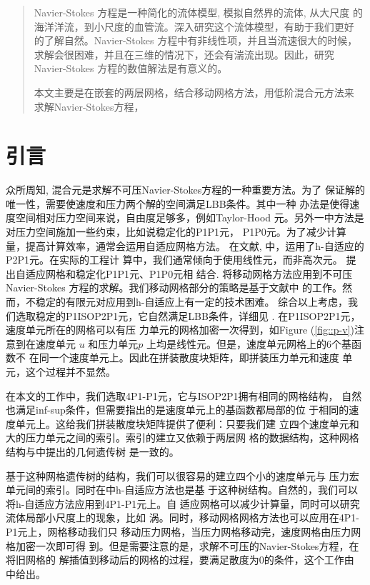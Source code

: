 \documentclass{report}
\theoremstyle{Remark}
\begin{document}
\begin{abstract}
   Navier-Stokes 方程是一种简化的流体模型, 模拟自然界的流体, 从大尺度
   的海洋洋流，到小尺度的血管流。深入研究这个流体模型，有助于我们更好
   的了解自然。Navier-Stokes 方程中有非线性项，并且当流速很大的时候，
   求解会很困难，并且在三维的情况下，还会有湍流出现。因此，研究
   Navier-Stokes 方程的数值解法是有意义的。
 
   本文主要是在嵌套的两层网格，结合移动网格方法，用低阶混合元方法来
   求解Navier-Stokes方程，

\end{abstract}   

\chapter{引言}
     众所周知, 混合元是求解不可压Navier-Stokes方程的一种重要方法。为了
     保证解的唯一性，需要使速度和压力两个解的空间满足LBB条件。其中一种
     办法是使得速度空间相对压力空间来说，自由度足够多，例如Taylor-Hood
     元。另外一中方法是对压力空间施加一些约束，比如说稳定化的P1P1元，
     P1P0元。为了减少计算量，提高计算效率，通常会运用自适应网格方法。
     在文献\cite{danaila2014newton},\cite{ebeida2009unsteady}
     \cite{berrone2009space}中，运用了h-自适应的P2P1元。在实际的工程计
     算中，我们通常倾向于使用线性元，而非高次元。
     \cite{zheng2010posteriori}提出自适应网格和稳定化P1P1元、P1P0元相
     结合. \cite{di2005moving}将移动网格方法应用到不可压Navier-Stokes
     方程的求解。我们移动网格部分的策略是基于文献\cite{di2005moving}中
     的工作。然而，不稳定的有限元对应用到h-自适应上有一定的技术困难。
     综合以上考虑，我们选取稳定的P1ISOP2P1元，它自然满足LBB条件，详细见
     \cite{bercovier1979error}. 在P1ISOP2P1元，速度单元所在的网格可以有压
     力单元的网格加密一次得到，如Figure (\ref{fig::p-v})注意到在速度单元
     $u$ 和压力单元$p$ 上均是线性元。但是，速度单元网格上的6个基函数不
     在同一个速度单元上。因此在拼装散度块矩阵，即拼装压力单元和速度
     单元，这个过程并不显然。

     在本文的工作中，我们选取4P1-P1元，它与ISOP2P1拥有相同的网格结构，
     自然也满足inf-sup条件，但需要指出的是速度单元上的基函数都局部的位
     于相同的速度单元上。这给我们拼装散度块矩阵提供了便利：只要我们建
     立四个速度单元和大的压力单元之间的索引。索引的建立又依赖于两层网
     格的数据结构，这种网格结构与\cite{li2005multi}中提出的几何遗传树
     是一致的。

     基于这种网格遗传树的结构，我们可以很容易的建立四个小的速度单元与
     压力宏单元间的索引。同时在\cite{li2005multi}中h-自适应方法也是基
     于这种树结构。自然的，我们可以将h-自适应方法应用到4P1-P1元上。自
     适应网格可以减少计算量，同时可以研究流体局部小尺度上的现象，比如
     涡。同时，移动网格网格方法也可以应用在4P1-P1元上，网格移动我们只
     移动压力网格，当压力网格移动完，速度网格由压力网格加密一次即可得
     到。但是需要注意的是，求解不可压的Navier-Stokes方程，在将旧网格的
     解插值到移动后的网格的过程，要满足散度为0的条件，这个工作由
     \cite{di2005moving}中给出。
\end{document}
